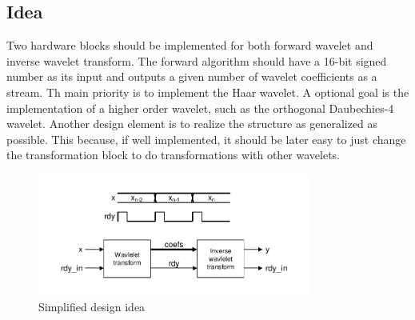 \begin{refsection}
%
%	
%
%

\subsection{Idea}

Two hardware blocks should be implemented for both forward wavelet and inverse wavelet transform.
The forward algorithm should have a 16-bit signed number as its input and outputs a given number of wavelet coefficients as a stream.
Th main priority is to implement the Haar wavelet.
A optional goal is the implementation of a higher order wavelet, such as the orthogonal Daubechies-4 wavelet.
Another design element is to realize the structure as generalized as possible.
This because, if well implemented, it should be later easy to just change the transformation block to do transformations with other wavelets.


\begin{figure}
	\centering
	\includegraphics[width=0.8\textwidth]{./images/idea.pdf}
	\caption{Simplified design idea  \label{fpga:idea}}
\end{figure}



\end{refsection}
